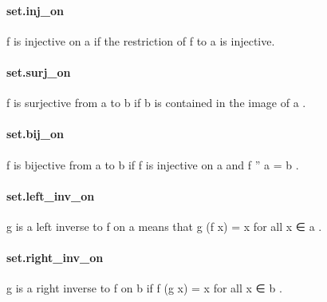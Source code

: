 \documentclass{article}
\begin{document}
\paragraph{set.inj\_on}
\par
\colorbox[RGB]{253,246,227}{{{{\color[RGB]{101, 123, 131} f }}}} is injective on 
\colorbox[RGB]{253,246,227}{{{{\color[RGB]{101, 123, 131} a }}}} if the restriction of 
\colorbox[RGB]{253,246,227}{{{{\color[RGB]{101, 123, 131} f }}}} to 
\colorbox[RGB]{253,246,227}{{{{\color[RGB]{101, 123, 131} a }}}} is injective.
\paragraph{set.surj\_on}
\par
\colorbox[RGB]{253,246,227}{{{{\color[RGB]{101, 123, 131} f }}}} is surjective from 
\colorbox[RGB]{253,246,227}{{{{\color[RGB]{101, 123, 131} a }}}} to 
\colorbox[RGB]{253,246,227}{{{{\color[RGB]{101, 123, 131} b }}}} if 
\colorbox[RGB]{253,246,227}{{{{\color[RGB]{101, 123, 131} b }}}} is contained in the image of 
\colorbox[RGB]{253,246,227}{{{{\color[RGB]{101, 123, 131} a }}}}.
\paragraph{set.bij\_on}
\par
\colorbox[RGB]{253,246,227}{{{{\color[RGB]{101, 123, 131} f }}}} is bijective from 
\colorbox[RGB]{253,246,227}{{{{\color[RGB]{101, 123, 131} a }}}} to 
\colorbox[RGB]{253,246,227}{{{{\color[RGB]{101, 123, 131} b }}}} if 
\colorbox[RGB]{253,246,227}{{{{\color[RGB]{101, 123, 131} f }}}} is injective on 
\colorbox[RGB]{253,246,227}{{{{\color[RGB]{101, 123, 131} a }}}} and 
\colorbox[RGB]{253,246,227}{{{{\color[RGB]{101, 123, 131} f '' a  }}}{{{\color[RGB]{181, 137, 0} = }}}{{{\color[RGB]{101, 123, 131}  b }}}}.
\paragraph{set.left\_inv\_on}
\par
\colorbox[RGB]{253,246,227}{{{{\color[RGB]{101, 123, 131} g }}}} is a left inverse to 
\colorbox[RGB]{253,246,227}{{{{\color[RGB]{101, 123, 131} f }}}} on 
\colorbox[RGB]{253,246,227}{{{{\color[RGB]{101, 123, 131} a }}}} means that 
\colorbox[RGB]{253,246,227}{{{{\color[RGB]{101, 123, 131} g (f x)  }}}{{{\color[RGB]{181, 137, 0} = }}}{{{\color[RGB]{101, 123, 131}  x }}}} for all 
\colorbox[RGB]{253,246,227}{{{{\color[RGB]{101, 123, 131} x ∈ a }}}}.
\paragraph{set.right\_inv\_on}
\par
\colorbox[RGB]{253,246,227}{{{{\color[RGB]{101, 123, 131} g }}}} is a right inverse to 
\colorbox[RGB]{253,246,227}{{{{\color[RGB]{101, 123, 131} f }}}} on 
\colorbox[RGB]{253,246,227}{{{{\color[RGB]{101, 123, 131} b }}}} if 
\colorbox[RGB]{253,246,227}{{{{\color[RGB]{101, 123, 131} f (g x)  }}}{{{\color[RGB]{181, 137, 0} = }}}{{{\color[RGB]{101, 123, 131}  x }}}} for all 
\colorbox[RGB]{253,246,227}{{{{\color[RGB]{101, 123, 131} x ∈ b }}}}.
\end{document}
